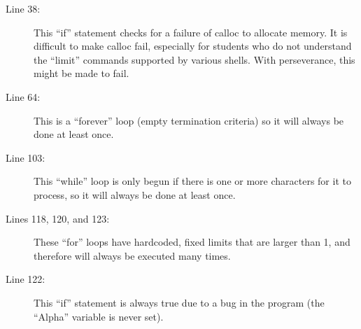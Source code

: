 \begin{description}
\item[Line 38:] This ``if'' statement checks for a failure of calloc to
allocate memory.  It is difficult to make calloc fail, especially for
students who do not understand the ``limit'' commands supported by
various shells.  With perseverance, this might be made to fail.

\item[Line 64:] This is a ``forever'' loop (empty termination
criteria) so it will always be done at least once.

\item[Line 103:] This ``while'' loop is only begun if there is one or
more characters for it to process, so it will always be done at least
once.

\item[Lines 118, 120, and 123:]  These ``for'' loops have hardcoded,
fixed limits that are larger than 1, and therefore will always be
executed many times.

\item[Line 122:] This ``if'' statement is always true due to a bug in
the program (the ``Alpha'' variable is never set).

\end{description}

